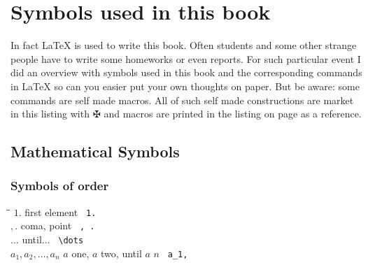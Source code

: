 \newcommand{\mySymbols}{\hspace*{0.2\textwidth}\=\hspace*{0.5\textwidth}\=\hspace*{0.2\textwidth}\kill}

\section{Symbols used in this book}
In fact \LaTeX\; is used to write this book. Often students and some other strange people have to write some homeworks or even reports. For such particular event I did an overview with symbols used in this book and the corresponding commands in \LaTeX\; so can you easier put your own thoughts on paper. But be aware: some commands are self made macros. All of such self made constructions are market in this listing with $\maltese$ and macros are printed in the listing on page \pageref{DSmyMacro} as a reference.
\subsection{Mathematical Symbols}
\subsubsection{Symbols of order}

\begin{tabbing}
\mySymbols
$ {1.}$               \> first element                   \> \verb` 1. `    \\
$ {, .}$              \> coma, point                     \> \verb` , . `   \\
$ {\dots}$            \> until...                        \> \verb` \dots ` \\
$ a_1,a_2,\dots ,a_n$ \> $a$ one, $a$ two, until $a$ $n$ \> \verb` a_1, `  \\
\end{tabbing}

